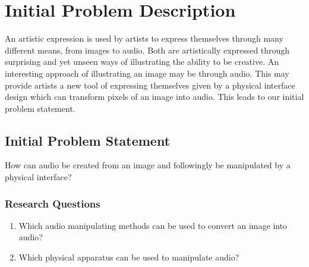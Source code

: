 \chapter{Initial Problem Description}\label{ch:initproblem}
An artistic expression is used by artists to express themselves through many different means, from images to audio. Both are artistically expressed through surprising and yet unseen ways of illustrating the ability to be creative. An interesting approach of  illustrating an image may be through audio. This may provide artists a new tool of expressing themselves given by a physical interface design which can transform pixels of an image into audio.  This leads to our initial problem statement.

\section{Initial Problem Statement}\label{inistatement}

How can audio be created from an image and followingly be manipulated by a physical interface? 

\subsection{Research Questions}\label{resquestions}

\begin{enumerate}
\item Which audio manipulating methods can be used to convert an image into audio?
\item Which physical apparatus can be used to manipulate audio?
\end{enumerate}

 




